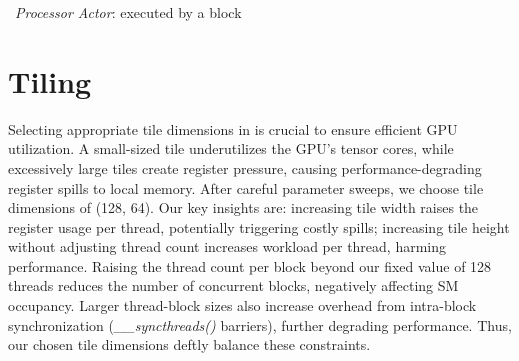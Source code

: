 \begin{algorithm}[!h]
    \DontPrintSemicolon
    \caption{~\emph{Processor Actor}: executed by a block}\label{alg:processor}
\end{algorithm}
\section{Tiling}\label{sec:tiling}
Selecting appropriate tile dimensions in \sysname is crucial to ensure efficient GPU utilization.
A small-sized tile underutilizes the GPU's tensor cores,
while excessively large tiles create register pressure,
causing performance-degrading register spills to local memory.
After careful parameter sweeps,
we choose tile dimensions of (128, 64).
Our key insights are: increasing tile width raises the register usage per thread,
potentially triggering costly spills;
increasing tile height without adjusting thread count increases workload per thread, harming performance.
Raising the thread count per block beyond our fixed value of 128 threads reduces the number of concurrent blocks,
negatively affecting SM occupancy.
Larger thread-block sizes also increase overhead from intra-block synchronization (\emph{\_\_syncthreads()} barriers),
further degrading performance.
Thus, our chosen tile dimensions deftly balance these constraints.